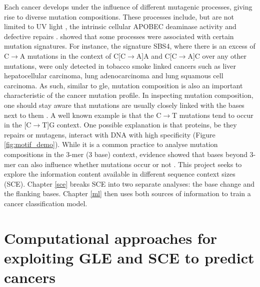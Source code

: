 Each cancer develops under the influence of different mutagenic processes, giving rise to diverse mutation compositions. These processes include, but are not limited to UV light \citep[known in skin melanoma;][]{Mohania2017}, the intrinsic cellular APOBEC deaminase activity \citep[\textit{e.g.} in B cells;][]{Kuppers2005MechanismsPathogenesis} and defective repairs \citep[\textit{e.g.} mutated \textit{BRCA} genes in breast cancer;][]{Navasardyan2021YY1TNBC}. \citet{Alexandrov2013, Alexandrov2020} showed that some processes were associated with certain mutation signatures. For instance, the signature SBS4, where there is an excess of C$\rightarrow$A mutations in the context of C[C$\rightarrow$A]A and C[C$\rightarrow$A]C over any other mutations, were only detected in tobacco smoke linked cancers such as liver hepatocellular carcinoma, lung adenocarcinoma and lung squamous cell carcinoma. As such, similar to \gls{gle}, mutation composition is also an important characteristic of the cancer mutation profile. In inspecting mutation composition, one should stay aware that mutations are usually closely linked with the \glspl{base} next to them \citep{Zhu2017}. A well known example is that the C$\rightarrow$T mutations tend to occur in the [C$\rightarrow$T]G context. One possible explanation is that proteins, be they repairs or mutagens, interact with DNA with high specificity (Figure \ref{fig:motif_demo}). While it is a common practice to analyse mutation compositions in the 3-mer (3 base) context, evidence showed that bases beyond 3-mer can also influence whether mutations occur or not \citep{Zhu2017,Zhu2020}. This project seeks to explore the information content available in different sequence context sizes (SCE). Chapter \ref{sce} breaks SCE into two separate analyses: the base change and the flanking bases. Chapter \ref{ml} then uses both sources of information to train a cancer classification model.  



\section{Computational approaches for exploiting GLE and SCE to predict cancers}
\label{intro:ml}

